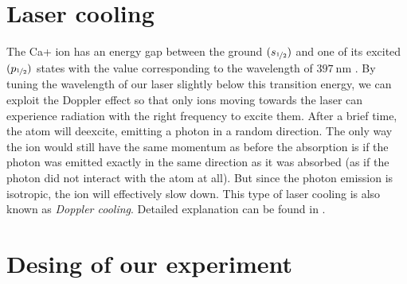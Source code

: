 \section{Laser cooling}
The Ca+ ion has an energy gap between the ground $(s_{\nicefrac{1}{2}})$ and one of its excited $(p_{\nicefrac{1}{2}})$ states with the value corresponding to the wavelength of $\SI{397}{\nano\meter}$ \cite{urabe1993laser}. By tuning the wavelength of our laser slightly below this transition energy, we can exploit the Doppler effect so that only ions moving towards the laser can experience radiation with the right frequency to excite them. After a brief time, the atom will deexcite, emitting a photon in a random direction. The only way the ion would still have the same momentum as before the absorption is if the photon was emitted exactly in the same direction as it was absorbed (as if the photon did not interact with the atom at all). But since the photon emission is isotropic, the ion will effectively slow down. This type of laser cooling is also known as \emph{Doppler cooling}. Detailed explanation can be found in \cite{alma990008711500106986}.   

\section{Desing of our experiment}
